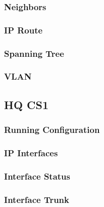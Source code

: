 \subsubsection{Neighbors}


\subsubsection{IP Route}


\subsubsection{Spanning Tree}


\subsubsection{VLAN}




\subsection{HQ CS1}
\subsubsection{Running Configuration}


\subsubsection{IP Interfaces}


\subsubsection{Interface Status}


\subsubsection{Interface Trunk}


